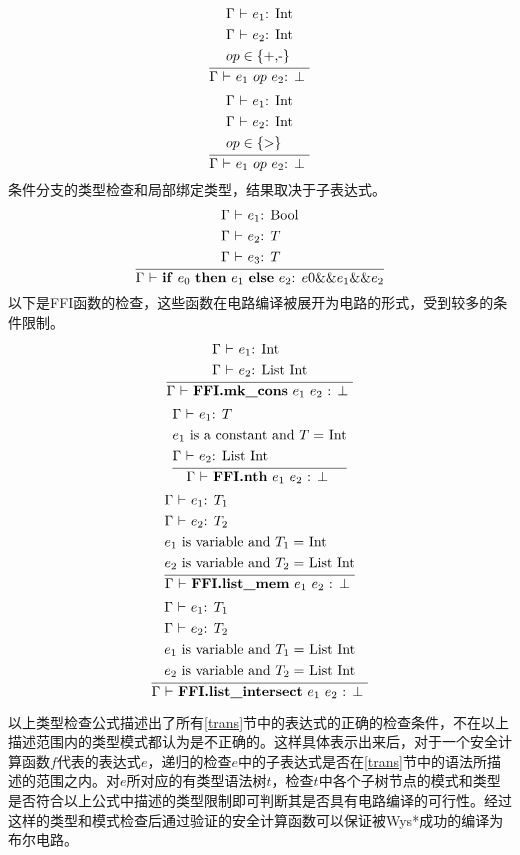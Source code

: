 \[
\infertext {
&\textrm{$\Gamma$ $\vdash$ $e_1$: Int}\\
&\textrm{$\Gamma$ $\vdash$ $e_2$: Int}\\
&\textrm{$op\in \{\text{+,-}\}$}
}{$\Gamma$ $\vdash$ $e_1\ op\ e_2$: $\perp$ }
\]
\[
\infertext {
&\textrm{$\Gamma$ $\vdash$ $e_1$: Int}\\
&\textrm{$\Gamma$ $\vdash$ $e_2$: Int}\\
&\textrm{$op\in \{\text{>}\}$}
}{$\Gamma$ $\vdash$ $e_1\ op\ e_2$: $\perp$ }
\]
条件分支的类型检查和局部绑定类型，结果取决于子表达式。
\[
\infertext {
&\textrm{$\Gamma$ $\vdash$ $e_1$: Bool}\\
&\textrm{$\Gamma$ $\vdash$ $e_2$: $T$}\\
&\textrm{$\Gamma$ $\vdash$ $e_3$: $T$}
}{$\Gamma$ $\vdash$ \textbf{if} $e_0$ \textbf{then} $e_1$ \textbf{else} $e_2$: $e0$\&\&$e_1$\&\&$e_2$}
\]
以下是FFI函数的检查，这些函数在电路编译被展开为电路的形式，受到较多的条件限制。
\[
\infertext {
&\textrm{$\Gamma$ $\vdash$ $e_1$: Int}\\
&\textrm{$\Gamma$ $\vdash$ $e_2$: List Int}\\
}{$\Gamma$ $\vdash$ \textbf{FFI.mk\_cons} $e_1$ $e_2$ : $\perp$ }
\]
\[
\infertext {
&\textrm{$\Gamma$ $\vdash$ $e_1$: $T$}\\
&\textrm{$e_1$ is a constant and $T=$ Int}\\
&\textrm{$\Gamma$ $\vdash$ $e_2$: List Int}\\
}{$\Gamma$ $\vdash$ \textbf{FFI.nth} $e_1$ $e_2$ : $\perp$ }
\]
\[
\infertext {
&\textrm{$\Gamma$ $\vdash$ $e_1$: $T_1$}\\
&\textrm{$\Gamma$ $\vdash$ $e_2$: $T_2$}\\
&\textrm{$e_1$ is variable and $T_1=$ Int}\\
&\textrm{$e_2$ is variable and $T_2=$ List Int}\\
}{$\Gamma$ $\vdash$ \textbf{FFI.list\_mem} $e_1$ $e_2$ : $\perp$ }
\]
\[
\infertext {
&\textrm{$\Gamma$ $\vdash$ $e_1$: $T_1$}\\
&\textrm{$\Gamma$ $\vdash$ $e_2$: $T_2$}\\
&\textrm{$e_1$ is variable and $T_1=$ List Int}\\
&\textrm{$e_2$ is variable and $T_2=$ List Int}\\
}{$\Gamma$ $\vdash$ \textbf{FFI.list\_intersect} $e_1$ $e_2$ : $\perp$ }
\]

以上类型检查公式描述出了所有\ref{trans}节中的表达式的正确的检查条件，不在以上描述范围内的类型模式都认为是不正确的。这样具体表示出来后，对于一个安全计算函数$f$代表的表达式$e$，递归的检查$e$中的子表达式是否在\ref{trans}节中的语法所描述的范围之内。对$e$所对应的有类型语法树$t$，检查$t$中各个子树节点的模式和类型是否符合以上公式中描述的类型限制即可判断其是否具有电路编译的可行性。经过这样的类型和模式检查后通过验证的安全计算函数可以保证被Wys*成功的编译为布尔电路。





